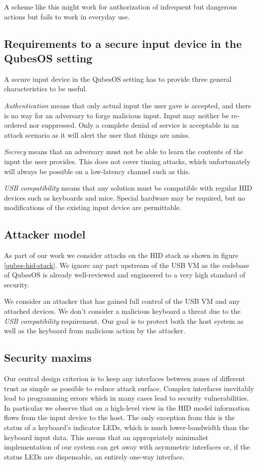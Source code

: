 \documentclass[12pt,a4paper,notitlepage]{article}
\begin{document}
A scheme like this might work for authorization of infrequent but dangerous actions but fails to work in everyday use.

\subsection{Requirements to a secure input device in the QubesOS setting}
A secure input device in the QubesOS setting has to provide three general characteristics to be useful.
\begin{enumeration}
\item \emph{Authentication} means that only actual input the user gave is accepted, and there is no way for an adversary
	to forge malicious input. Input may neither be re-ordered nor suppressed. Only a complete denial of service is
	acceptable in an attack scenario as it will alert the user that things are amiss.
\item \emph{Secrecy} means that an adversary must not be able to learn the contents of the input the user provides. This
	does not cover timing attacks, which unfortunately will always be possible on a low-latency channel such as
	this.
\item \emph{USB compatibility} means that any solution must be compatible with regular HID devices such as keyboards and
	mice. Special hardware may be required, but no modifications of the existing input device are permittable.
\end{enumeration}

\subsection{Attacker model}
As part of our work we consider attacks on the HID stack as shown in figure \ref{qubes-hid-stack}. We ignore any part
upstream of the USB VM as the codebase of QubesOS is already well-reviewed and engineered to a very high standard of
security.

We consider an attacker that has gained full control of the USB VM and any attached devices. We don't consider a
malicious keyboard a threat due to the \emph{USB compatibility} requirement. Our goal is to protect both the host system
as well as the keyboard from malicious action by the attacker.

\subsection{Security maxims}
Our central design criterion is to keep any interfaces between zones of different trust as simple as possible to reduce
attack surface. Complex interfaces inevitably lead to programming errors which in many cases lead to security
vulnerabilities. In particular we observe that on a high-level view in the HID model information flows from the input
device to the host. The only exception from this is the status of a keyboard's indicator LEDs, which is much
lower-bandwidth than the keyboard input data. This means that an appropriately minimalist implementation of our system
can get away with asymmetric interfaces or, if the status LEDs are dispensable, an entirely one-way interface.
\end{document}

